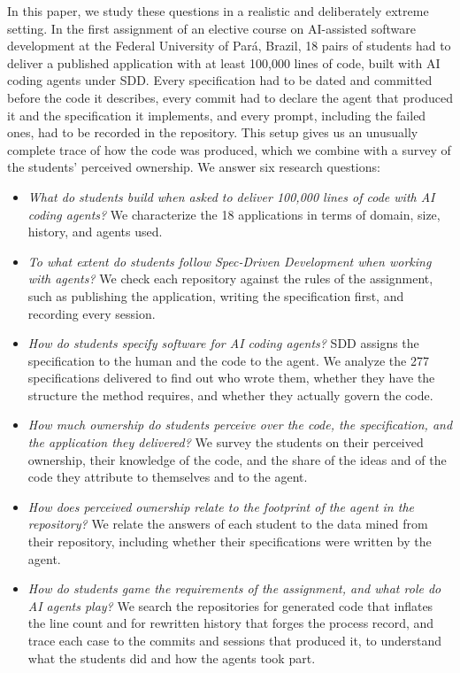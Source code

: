 \documentclass[conference]{IEEEtran}
\begin{document}
In this paper, we study these questions in a realistic and deliberately extreme setting. In the first assignment of an elective course on AI-assisted software development at the Federal University of Pará, Brazil, 18 pairs of students had to deliver a published application with at least 100,000 lines of code, built with AI coding agents under SDD. Every specification had to be dated and committed before the code it describes, every commit had to declare the agent that produced it and the specification it implements, and every prompt, including the failed ones, had to be recorded in the repository. This setup gives us an unusually complete trace of how the code was produced, which we combine with a survey of the students' perceived ownership. We answer six research questions:

\begin{itemize}
\item[\textbf{RQ1}] \emph{What do students build when asked to deliver 100,000 lines of code with AI coding agents?} We characterize the 18 applications in terms of domain, size, history, and agents used.
\item[\textbf{RQ2}] \emph{To what extent do students follow Spec-Driven Development when working with agents?} We check each repository against the rules of the assignment, such as publishing the application, writing the specification first, and recording every session.
\item[\textbf{RQ3}] \emph{How do students specify software for AI coding agents?} SDD assigns the specification to the human and the code to the agent. We analyze the 277 specifications delivered to find out who wrote them, whether they have the structure the method requires, and whether they actually govern the code.
\item[\textbf{RQ4}] \emph{How much ownership do students perceive over the code, the specification, and the application they delivered?} We survey the students on their perceived ownership, their knowledge of the code, and the share of the ideas and of the code they attribute to themselves and to the agent.
\item[\textbf{RQ5}] \emph{How does perceived ownership relate to the footprint of the agent in the repository?} We relate the answers of each student to the data mined from their repository, including whether their specifications were written by the agent.
\item[\textbf{RQ6}] \emph{How do students game the requirements of the assignment, and what role do AI agents play?} We search the repositories for generated code that inflates the line count and for rewritten history that forges the process record, and trace each case to the commits and sessions that produced it, to understand what the students did and how the agents took part.
\end{itemize}
\end{document}
